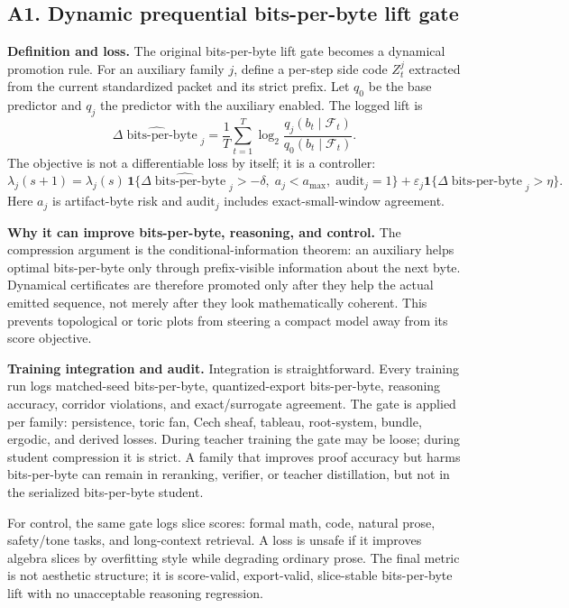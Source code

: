 \documentclass[10pt]{article}
\newcommand{\bitsperbyte}{\operatorname{bits\text{-}per\text{-}byte}}
\newcommand{\eps}{\varepsilon}
\numberwithin{equation}{section}
\begin{document}
\subsection{A1. Dynamic prequential bits-per-byte lift gate}
\noindent\textbf{Definition and loss.} The original bits-per-byte lift gate becomes a dynamical promotion rule. For an auxiliary family $j$, define a per-step side code $Z^j_t$ extracted from the current standardized packet and its strict prefix. Let $q_{0}$ be the base predictor and $q_j$ the predictor with the auxiliary enabled. The logged lift is
\[
\widehat{\Delta\bitsperbyte}_j=\frac1T\sum_{t=1}^T\log_2\frac{q_j(b_t\mid\mathcal F_t)}{q_0(b_t\mid\mathcal F_t)}.
\]
The objective is not a differentiable loss by itself; it is a controller:
\[
\lambda_j(s+1)=\lambda_j(s)\,\mathbf 1\{\widehat{\Delta\bitsperbyte}_j> -\delta,\;a_j<a_{\max},\;\mathrm{audit}_j=1\}+\eps_j\mathbf 1\{\widehat{\Delta\bitsperbyte}_j>\eta\}.
\]
Here $a_j$ is artifact-byte risk and $\mathrm{audit}_j$ includes exact-small-window agreement.

\noindent\textbf{Why it can improve bits-per-byte, reasoning, and control.} The compression argument is the conditional-information theorem: an auxiliary helps optimal bits-per-byte only through prefix-visible information about the next byte. Dynamical certificates are therefore promoted only after they help the actual emitted sequence, not merely after they look mathematically coherent. This prevents topological or toric plots from steering a compact model away from its score objective.

\noindent\textbf{Training integration and audit.} Integration is straightforward. Every training run logs matched-seed bits-per-byte, quantized-export bits-per-byte, reasoning accuracy, corridor violations, and exact/surrogate agreement. The gate is applied per family: persistence, toric fan, Cech sheaf, tableau, root-system, bundle, ergodic, and derived losses. During teacher training the gate may be loose; during student compression it is strict. A family that improves proof accuracy but harms bits-per-byte can remain in reranking, verifier, or teacher distillation, but not in the serialized bits-per-byte student.

For control, the same gate logs slice scores: formal math, code, natural prose, safety/tone tasks, and long-context retrieval. A loss is unsafe if it improves algebra slices by overfitting style while degrading ordinary prose. The final metric is not aesthetic structure; it is score-valid, export-valid, slice-stable bits-per-byte lift with no unacceptable reasoning regression.
\end{document}
